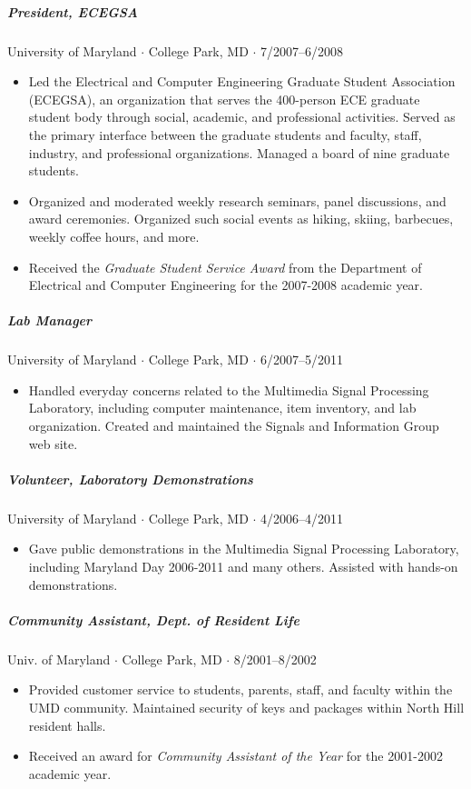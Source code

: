 \documentclass[10pt,letterpaper]{article}
\begin{document}
\subparagraph{President, ECEGSA}
University of Maryland $\cdot$ College Park, MD $\cdot$ 7/2007--6/2008
\begin{itemize}
    \item Led the Electrical and Computer Engineering Graduate Student Association (ECEGSA), an organization that serves the 400-person ECE graduate student body through social, academic, and professional activities.  Served as the primary interface between the graduate students and faculty, staff, industry, and professional organizations.  Managed a board of nine graduate students. 
    \item Organized and moderated weekly research seminars, panel discussions, and award ceremonies.  Organized such social events as hiking, skiing, barbecues, weekly coffee hours, and more.
    \item Received the \textit{Graduate Student Service Award} from the Department of Electrical and Computer Engineering for the 2007-2008 academic year.
\end{itemize}

\subparagraph{Lab Manager}
University of Maryland $\cdot$ College Park, MD $\cdot$ 6/2007--5/2011
\begin{itemize}
    \item Handled everyday concerns related to the Multimedia Signal Processing Laboratory, including computer maintenance, item inventory, and lab organization. Created and maintained the Signals and Information Group web site.
\end{itemize}

\subparagraph{Volunteer, Laboratory Demonstrations}
University of Maryland $\cdot$ College Park, MD $\cdot$ 4/2006--4/2011
\begin{itemize}
    \item Gave public demonstrations in the Multimedia Signal Processing Laboratory, including Maryland Day 2006-2011 and many others. Assisted with hands-on demonstrations.
\end{itemize}

\subparagraph{Community Assistant, Dept. of Resident Life}
Univ. of Maryland $\cdot$ College Park, MD $\cdot$ 8/2001--8/2002
\begin{itemize}
    \item Provided customer service to students, parents, staff, and faculty within the UMD community. Maintained security of keys and packages within North Hill resident halls.
    \item Received an award for \textit{Community Assistant of the Year} for the 2001-2002 academic year.
\end{itemize}
\end{document}
